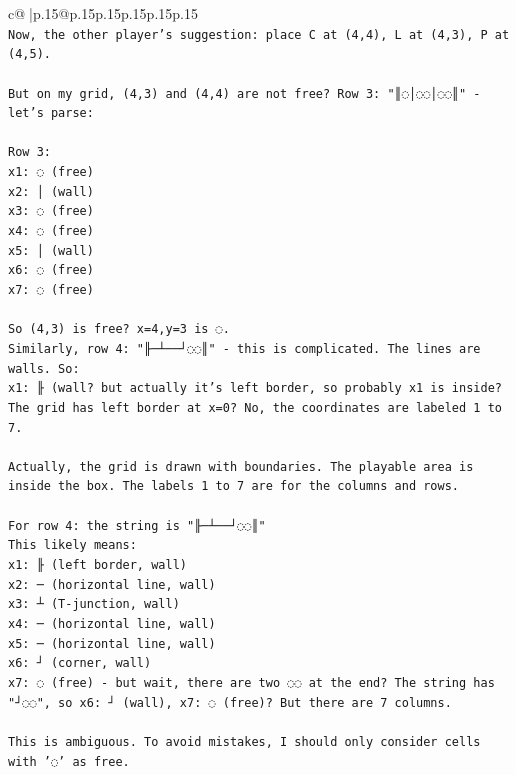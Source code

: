 \documentclass{article}
\begin{document}
{\begin{supertabular}{c@{$\;$}|p{.15\linewidth}@{}p{.15\linewidth}p{.15\linewidth}p{.15\linewidth}p{.15\linewidth}p{.15\linewidth}}
{{{\\ 
\texttt{Now, the other player's suggestion: place C at (4,4), L at (4,3), P at (4,5).} \\
\\ 
\texttt{But on my grid, (4,3) and (4,4) are not free? Row 3: "║◌│◌◌│◌◌║" {-} let's parse:} \\
\\ 
\texttt{Row 3: } \\
\texttt{x1: ◌ (free)} \\
\texttt{x2: │ (wall)} \\
\texttt{x3: ◌ (free)} \\
\texttt{x4: ◌ (free)} \\
\texttt{x5: │ (wall)} \\
\texttt{x6: ◌ (free)} \\
\texttt{x7: ◌ (free)} \\
\\ 
\texttt{So (4,3) is free? x=4,y=3 is ◌.} \\
\texttt{Similarly, row 4: "╟─┴──┘◌◌║" {-} this is complicated. The lines are walls. So:} \\
\texttt{x1: ╟ (wall? but actually it's left border, so probably x1 is inside? The grid has left border at x=0? No, the coordinates are labeled 1 to 7.} \\
\\ 
\texttt{Actually, the grid is drawn with boundaries. The playable area is inside the box. The labels 1 to 7 are for the columns and rows.} \\
\\ 
\texttt{For row 4: the string is "╟─┴──┘◌◌║"} \\
\texttt{This likely means:} \\
\texttt{x1: ╟ (left border, wall)} \\
\texttt{x2: ─ (horizontal line, wall)} \\
\texttt{x3: ┴ (T{-}junction, wall)} \\
\texttt{x4: ─ (horizontal line, wall)} \\
\texttt{x5: ─ (horizontal line, wall)} \\
\texttt{x6: ┘ (corner, wall)} \\
\texttt{x7: ◌ (free) {-} but wait, there are two ◌◌ at the end? The string has "┘◌◌", so x6: ┘ (wall), x7: ◌ (free)? But there are 7 columns.} \\
\\ 
\texttt{This is ambiguous. To avoid mistakes, I should only consider cells with '◌' as free.} \\
}}}
\end{supertabular}}
\end{document}
